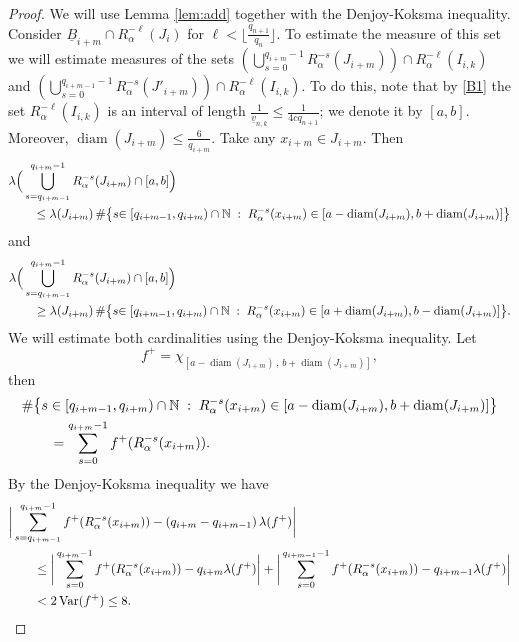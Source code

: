 \documentclass[10pt,a4paper]{amsart}
\DeclareMathOperator{\Var}{Var}
\DeclareMathOperator{\diam}{diam}
\def\N{\mathbb{N}}
\begin{document}
\begin{proof}
 We will use Lemma \ref{lem:add} together with the Denjoy-Koksma inequality. Consider $\underline{B}_{i+m}\cap R_\alpha^{-\ell}(J_i)$ for 
$\ell< \lfloor \frac{q_{n+1}}{q_n}\rfloor$. To estimate the measure of this set we  will estimate measures of the sets 
$(\bigcup_{s=0}^{q_{i+m}-1}R^{-s}_\alpha(J_{i+m}))\cap R_{\alpha}^{-\ell} (I_{i,k})$ and  $(\bigcup_{s=0}^{q_{i+m-1}-1}R^{-s}_\alpha(J'_{i+m}))\cap R_{\alpha}^{-\ell} (I_{i,k})$. To do this, note that by \ref{B1} the set $R_{\alpha}^{-\ell} (I_{i,k})$ is an interval of length $\frac{1}{\underline{v}_{n,k}}\leq \frac{1}{4cq_{n+1}}$;
we denote it by $[a,b]$. 
Moreover, $\diam(J_{i+m})\leq \frac{6}{q_{i+m}}$. Take any $x_{i+m}\in J_{i+m}$. Then 
\begin{align*}
 \MoveEqLeft\lambda\Big(\bigcup_{ s=q_{i+m-1}}^{q_{i+m}-1}R^{-s}_\alpha(J_{i+m})\cap [a,b]\Big)\\
 &\leq \lambda(J_{i+m})\, \#\big\{s { \in [q_{i+m-1},q_{i+m})\cap\N}\;:\; R^{-s}_\alpha(x_{i+m})\in [a- \diam(J_{i+m}),b+\diam(J_{i+m})]\big\} 
\end{align*}
and 
\begin{align*}
 \MoveEqLeft\lambda\Big(\bigcup_{s=q_{i+m-1}}^{q_{i+m}-1}R^{-s}_\alpha(J_{i+m})\cap [a,b]\Big)\\
 &\geq \lambda(J_{i+m})\, \#\big\{s{ \in [q_{i+m-1},q_{i+m})\cap\N}\;:\; R^{-s}_\alpha(x_{i+m})\in [a+ \diam(J_{i+m}),b-\diam(J_{i+m})]\big\}.
\end{align*}
We will estimate both cardinalities using the Denjoy-Koksma inequality. Let 
$$f^+=\chi_{[a- \diam(J_{i+m})\,,\,b+\diam(J_{i+m})]},$$ 
then 
\begin{align*}
 \MoveEqLeft\#\big\{s  \in [q_{i+m-1},q_{i+m})\cap\N\;:\; R^{-s}_\alpha(x_{i+m})\in [a- \diam(J_{i+m}),b+\diam(J_{i+m})]\big\}\\
 &= \sum_{s=0}^{q_{i+m}-1}f^+(R^{-s}_\alpha(x_{i+m})).
\end{align*}
By the Denjoy-Koksma inequality we have
\begin{align*}
 \MoveEqLeft\bigg|\sum_{s=q_{i+m-1}}^{q_{i+m}-1}f^+(R^{-s}_\alpha(x_{i+m}))- \left(q_{i+m}-q_{i+m-1}\right)\lambda(f^+)\bigg|\\
 &\leq \bigg|\sum_{s=0}^{q_{i+m}-1}f^+(R^{-s}_\alpha(x_{i+m}))- q_{i+m}\lambda(f^+)\bigg|
 +\bigg|\sum_{s=0}^{q_{i+m-1}-1}f^+(R^{-s}_\alpha(x_{i+m}))- q_{i+m-1}\lambda(f^+)\bigg|\\
 &<2\Var(f^+)\leq 8.
\end{align*}


\end{proof}
\end{document}
